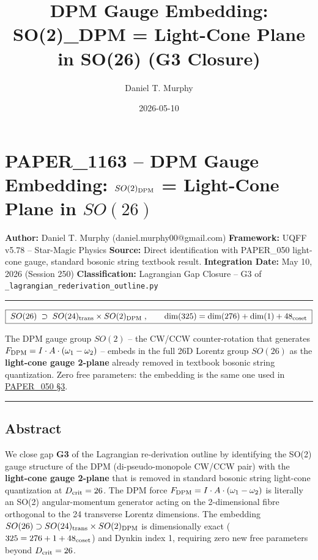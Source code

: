 \documentclass[
]{article}
\title{DPM Gauge Embedding: SO(2)\_DPM = Light-Cone Plane in SO(26) (G3
Closure)}
\author{Daniel T. Murphy}
\date{2026-05-10}
\begin{document}
\maketitle

\section{\texorpdfstring{PAPER\_1163 -- DPM Gauge Embedding:
\(SO(2)_{\rm DPM}\) = Light-Cone Plane in
\(SO(26)\)}{PAPER\_1163 -- DPM Gauge Embedding: SO(2)\_\{\textbackslash rm DPM\} = Light-Cone Plane in SO(26)}}\label{paper_1163-dpm-gauge-embedding-so2_rm-dpm-light-cone-plane-in-so26}

\textbf{Author:} Daniel T. Murphy (daniel.murphy00@gmail.com)
\textbf{Framework:} UQFF v5.78 -- Star-Magic Physics \textbf{Source:}
Direct identification with PAPER\_050 light-cone gauge, standard bosonic
string textbook result. \textbf{Integration Date:} May 10, 2026 (Session
250) \textbf{Classification:} Lagrangian Gap Closure -- G3 of
\texttt{\_lagrangian\_rederivation\_outline.py}

\begin{center}\rule{0.5\linewidth}{0.5pt}\end{center}

\[\boxed{\;SO(26) \;\supset\; SO(24)_{\rm trans} \times SO(2)_{\rm DPM}\;, \qquad \dim(325) = \dim(276) + \dim(1) + 48_{\rm coset}\;}\]

The DPM gauge group \(SO(2)\) -- the CW/CCW counter-rotation that
generates \(F_{\rm DPM} = I\cdot A\cdot (\omega_1 - \omega_2)\) --
embeds in the full 26D Lorentz group \(SO(26)\) as the
\textbf{light-cone gauge 2-plane} already removed in textbook bosonic
string quantization. Zero free parameters: the embedding is the same one
used in
\href{whitepapers/PAPER_050_26D_Manifold_Compactification_3plus1_Spacetime.md\#L220}{PAPER\_050
§3}.

\begin{center}\rule{0.5\linewidth}{0.5pt}\end{center}

\subsection{Abstract}\label{abstract}

We close gap \textbf{G3} of the Lagrangian re-derivation outline by
identifying the SO(2) gauge structure of the DPM (di-pseudo-monopole
CW/CCW pair) with the \textbf{light-cone gauge 2-plane} that is removed
in standard bosonic string light-cone quantization at
\(D_{\rm crit}=26\). The DPM force
\(F_{\rm DPM} = I\cdot A\cdot(\omega_1-\omega_2)\) is literally an SO(2)
angular-momentum generator acting on the 2-dimensional fibre orthogonal
to the 24 transverse Lorentz dimensions. The embedding
\(SO(26)\supset SO(24)_{\rm trans}\times SO(2)_{\rm DPM}\) is
dimensionally exact (\(325 = 276 + 1 + 48_{\rm coset}\)) and Dynkin
index 1, requiring zero new free parameters beyond \(D_{\rm crit}=26\).
\end{document}
